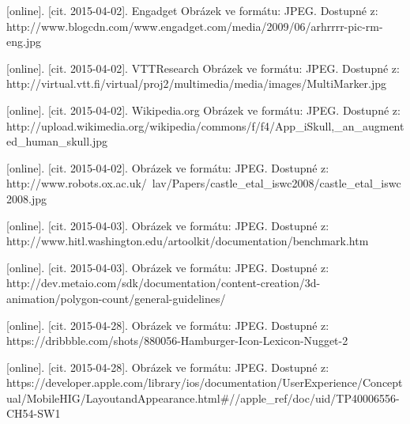\documentclass[twoside,12pt]{article}
\begin{document}
\begin{literatura}
{
	[online]. [cit. 2015-04-02]. Engadget
	Obrázek ve formátu: JPEG. Dostupné z: http://www.blogcdn.com/www.engadget.com/media/2009/06/arhrrrr-pic-rm-eng.jpg
}

{
	[online]. [cit. 2015-04-02]. VTTResearch
	Obrázek ve formátu: JPEG. Dostupné z: http://virtual.vtt.fi/virtual/proj2/multimedia/media/images/MultiMarker.jpg
}

{
	[online]. [cit. 2015-04-02]. Wikipedia.org
	Obrázek ve formátu: JPEG. Dostupné z: http://upload.wikimedia.org/wikipedia/commons/f/f4/App\_iSkull,\_an\_augmented\_human\_skull.jpg
}

{
	[online]. [cit. 2015-04-02]. 
	Obrázek ve formátu: JPEG. Dostupné z: http://www.robots.ox.ac.uk/~lav/Papers/castle\_etal\_iswc2008/castle\_etal\_iswc2008.jpg
}

{
	[online]. [cit. 2015-04-03]. 
	Obrázek ve formátu: JPEG. Dostupné z: http://www.hitl.washington.edu/artoolkit/documentation/benchmark.htm
}

{
	[online]. [cit. 2015-04-03]. 
	Obrázek ve formátu: JPEG. Dostupné z: http://dev.metaio.com/sdk/documentation/content-creation/3d-animation/polygon-count/general-guidelines/
}

{
	[online]. [cit. 2015-04-28]. 
	Obrázek ve formátu: JPEG. Dostupné z: https://dribbble.com/shots/880056-Hamburger-Icon-Lexicon-Nugget-2
}

{
	[online]. [cit. 2015-04-28]. 
	Obrázek ve formátu: JPEG. Dostupné z: https://developer.apple.com/library/ios/documentation/UserExperience/Conceptual/MobileHIG/LayoutandAppearance.html\#//apple\_ref/doc/uid/TP40006556-CH54-SW1
}

%




\end{literatura}
\end{document}
